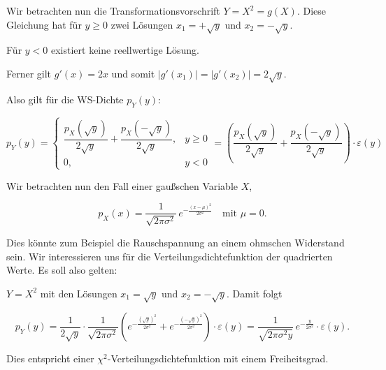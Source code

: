 \begin{beispiel}[Nichtlineare Transformation: $Y = X^2$]
Wir betrachten nun die Transformationsvorschrift $Y = X^2 = g(X)$. Diese Gleichung hat für $y \geq 0$ zwei Lösungen $x_1 = +\sqrt{y}$ und $x_2 = -\sqrt{y}$.

Für $y < 0$ existiert keine reellwertige Lösung.

Ferner gilt $g'(x) = 2x$ und somit $|g'(x_1)| = |g'(x_2)| = 2\sqrt{y}$.

Also gilt für die WS-Dichte $p_Y(y)$:

$$
p_Y(y) = \begin{cases}
\dfrac{p_X(\sqrt{y})}{2\sqrt{y}} + \dfrac{p_X(-\sqrt{y})}{2\sqrt{y}}, & y \geq 0 \\[6pt]
0, & y < 0
\end{cases}
= \left(\frac{p_X(\sqrt{y})}{2\sqrt{y}} + \frac{p_X(-\sqrt{y})}{2\sqrt{y}}\right) \cdot \varepsilon(y)
$$
\end{beispiel}

\begin{beispiel}[Normalverteilung]
Wir betrachten nun den Fall einer gaußschen Variable $X$,

$$
p_X(x) = \frac{1}{\sqrt{2\pi\sigma^2}}\,e^{-\frac{(x-\mu)^2}{2\sigma^2}} \quad \text{mit } \mu = 0.
$$

Dies könnte zum Beispiel die Rauschspannung an einem ohmschen Widerstand sein. Wir interessieren uns für die Verteilungsdichtefunktion der quadrierten Werte. Es soll also gelten:

$Y = X^2$ mit den Lösungen $x_1 = \sqrt{y}$ und $x_2 = -\sqrt{y}$. Damit folgt

$$
p_Y(y) = \frac{1}{2\sqrt{y}} \cdot \frac{1}{\sqrt{2\pi\sigma^2}} \left(e^{-\frac{(\sqrt{y})^2}{2\sigma^2}} + e^{-\frac{(-\sqrt{y})^2}{2\sigma^2}}\right) \cdot \varepsilon(y)
= \frac{1}{\sqrt{2\pi\sigma^2 y}}\,e^{-\frac{y}{2\sigma^2}} \cdot \varepsilon(y).
$$

Dies entspricht einer $\chi^2$-Verteilungsdichtefunktion mit einem Freiheitsgrad.
\end{beispiel}

